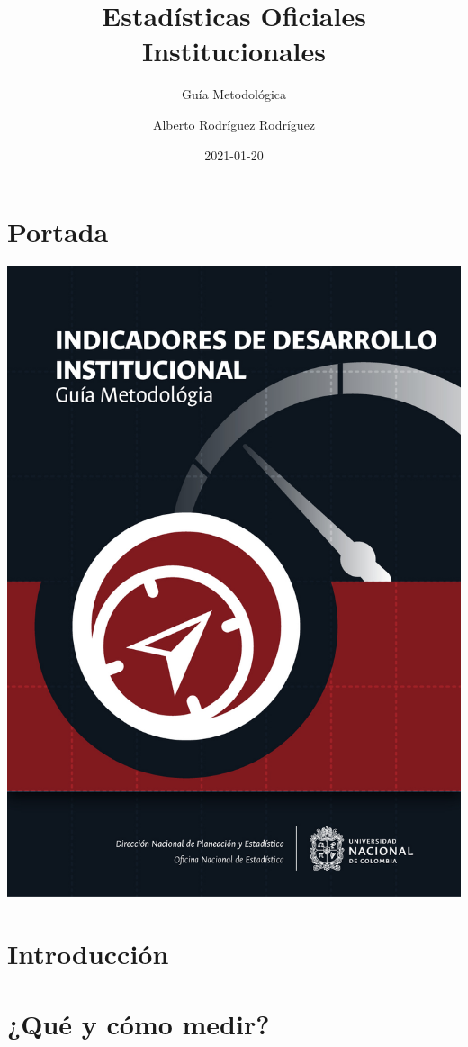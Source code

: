 \documentclass[
]{book}
\title{Estadísticas Oficiales Institucionales}
\subtitle{Guía Metodológica}
\author{Alberto Rodríguez Rodríguez}
\date{2021-01-20}
\begin{document}
\maketitle

{
\setcounter{tocdepth}{1}
\tableofcontents
}
\hypertarget{portada}{%
\chapter*{Portada}\label{portada}}

\begin{center}\includegraphics[width=0.75\linewidth]{imagenes/Portada} \end{center}

\hypertarget{intro}{%
\chapter{\texorpdfstring{\textbf{Introducción}}{Introducción}}\label{intro}}

\hypertarget{quuxe9-y-cuxf3mo-medir}{%
\chapter{\texorpdfstring{\textbf{¿Qué y cómo medir?}}{¿Qué y cómo medir?}}\label{quuxe9-y-cuxf3mo-medir}}
\end{document}
